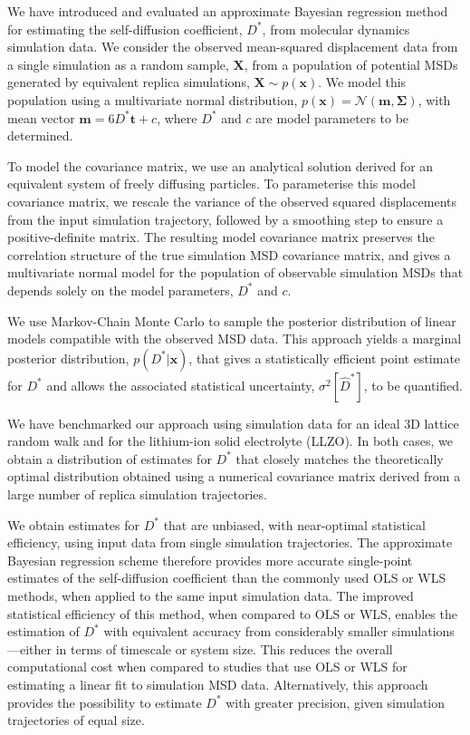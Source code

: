 \documentclass[reprint,superscriptaddress,nobibnotes,amsmath,amssymb,aps,prx,hidelinks]{revtex4-2}
\newcommand{\oMSD}{\ensuremath{\bm{x}}}
\newcommand{\model}{\bm{m}}
\newcommand{\prob}[1]{\ensuremath{p(#1)}}
\newcommand{\Dest}{\ensuremath{\widehat{D}^*}}
\newcommand{\D}{\ensuremath{D^*}}
\newcommand{\var}[1]{\ensuremath{\sigma^2[#1]}}
\begin{document}
We have introduced and evaluated an approximate Bayesian regression method for estimating the self-diffusion coefficient, $\D$, from molecular dynamics simulation data.
We consider the observed mean-squared displacement data from a single simulation as a random sample, $\bm{X}$, from a population of potential MSDs generated by equivalent replica simulations, $\bm{X}\sim p(\oMSD)$.
We model this population using a multivariate normal distribution, $p(\oMSD) = \mathcal{N}(\model, \mathbf{\Sigma})$, with mean vector $\model = 6\D\bm{t} + c$, where $\D$ and $c$ are model parameters to be determined.

To model the covariance matrix, we use an analytical solution derived for an equivalent system of freely diffusing particles.
To parameterise this model covariance matrix, we rescale the variance of the observed squared displacements from the input simulation trajectory, followed by a smoothing step to ensure a positive-definite matrix.
The resulting model covariance matrix preserves the correlation structure of the true simulation MSD covariance matrix, and gives a multivariate normal model for the population of observable simulation MSDs that depends solely on the model parameters, $\D$ and $c$.

We use Markov-Chain Monte Carlo to sample the posterior distribution of linear models compatible with the observed MSD data.
This approach yields a marginal posterior distribution, $\prob{\D | \oMSD}$, that gives a statistically efficient point estimate for $\D$ and allows the associated statistical uncertainty, $\var{\Dest}$, to be quantified.

We have benchmarked our approach using simulation data for an ideal 3D lattice random walk and for the lithium-ion solid electrolyte  (LLZO).
In both cases, we obtain a distribution of estimates for $\D$ that closely matches the theoretically optimal distribution obtained using a numerical covariance matrix derived from a large number of replica simulation trajectories.

We obtain estimates for $\D$ that are unbiased, with near-optimal statistical efficiency, using input data from single simulation trajectories.
The approximate Bayesian regression scheme therefore provides more accurate single-point estimates of the self-diffusion coefficient than the commonly used OLS or WLS methods, when applied to the same input simulation data.
The improved statistical efficiency of this method, when compared to OLS or WLS, enables the estimation of $\D$ with equivalent accuracy from considerably smaller simulations---either in terms of timescale or system size. 
This reduces the overall computational cost when compared to studies that use OLS or WLS for estimating a linear fit to simulation MSD data.
Alternatively, this approach provides the possibility to estimate $\D$ with greater precision, given simulation trajectories of equal size.
\end{document}
